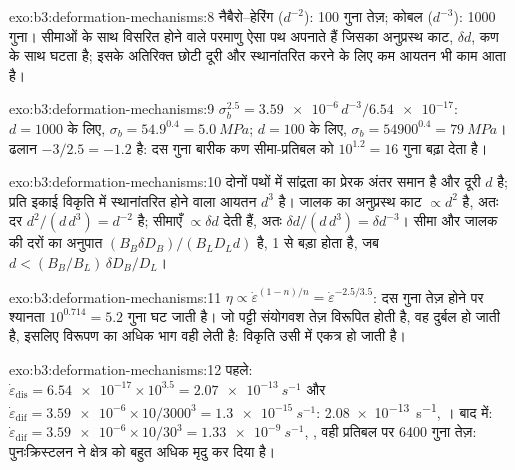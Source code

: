 \begin{solution}{exo:b3:deformation-mechanisms:8}
नैबैरो--हेरिंग ($d^{-2}$): 100 गुना तेज़; कोबल ($d^{-3}$): 1000 गुना।
सीमाओं के साथ विसरित होने वाले परमाणु ऐसा पथ अपनाते हैं जिसका अनुप्रस्थ काट, $\delta
d$, कण के साथ घटता है; इसके अतिरिक्त छोटी दूरी और
स्थानांतरित करने के लिए कम आयतन भी काम आता है।
\end{solution}

\begin{solution}{exo:b3:deformation-mechanisms:9}
$\sigma_b^{2.5} = \num{3.59e-6}\,d^{-3}/\num{6.54e-17}$: $d = 1000$ के लिए,
$\sigma_b = 54.9^{0.4} = \qty{5.0}{MPa}$; $d = 100$ के लिए, $\sigma_b =
\num{54900}^{0.4} = \qty{79}{MPa}$। ढलान $-3/2.5 = -1.2$ है: दस गुना
बारीक कण सीमा-प्रतिबल को $10^{1.2} = 16$ गुना बढ़ा देता है।
\end{solution}

\begin{solution}{exo:b3:deformation-mechanisms:10}
दोनों पथों में सांद्रता का प्रेरक अंतर समान है और
दूरी $d$ है; प्रति इकाई विकृति में स्थानांतरित होने वाला आयतन $d^3$ है।
जालक का अनुप्रस्थ काट $\propto d^2$ है, अतः दर $d^2/(d\,d^3) =
d^{-2}$ है; सीमाएँ $\propto\delta d$ देती हैं, अतः $\delta d/(d\,d^3) = \delta
d^{-3}$। सीमा और जालक की दरों का अनुपात $(B_B\delta D_B)/(B_LD_Ld)$ है,
1 से बड़ा होता है, जब $d < (B_B/B_L)\,\delta D_B/D_L$।
\end{solution}

\begin{solution}{exo:b3:deformation-mechanisms:11}
$\eta \propto \dot\varepsilon^{(1-n)/n} = \dot\varepsilon^{-2.5/3.5}$: दस गुना
तेज़ होने पर श्यानता $10^{0.714} = 5.2$ गुना घट जाती है। जो पट्टी संयोगवश
तेज़ विरूपित होती है, वह दुर्बल हो जाती है, इसलिए विरूपण का अधिक भाग वही लेती है:
विकृति उसी में एकत्र हो जाती है।
\end{solution}

\begin{solution}{exo:b3:deformation-mechanisms:12}
पहले: $\dot\varepsilon_{\mathrm{dis}} = \num{6.54e-17}\times10^{3.5} =
\qty{2.07e-13}{s^{-1}}$ और $\dot\varepsilon_{\mathrm{dif}} = \num{3.59e-6}
\times10/3000^3 = \qty{1.3e-15}{s^{-1}}$: \qty{2.08e-13}{s^{-1}}, । बाद में: $\dot\varepsilon_{\mathrm{dif}} = \num{3.59e-6}\times10/30^3 =
\qty{1.33e-9}{s^{-1}}$, , वही प्रतिबल पर \num{6400} गुना तेज़:
पुनःक्रिस्टलन ने क्षेत्र को बहुत अधिक मृदु कर दिया है।
\end{solution}

